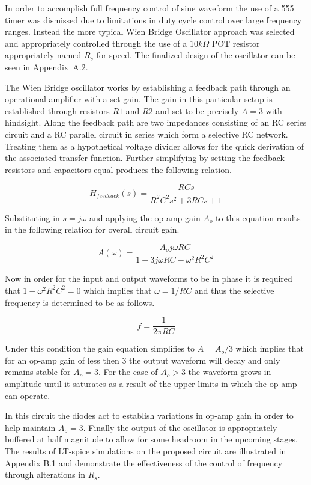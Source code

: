 \documentclass[12pt]{article}
\begin{document}
In order to accomplish full frequency control of sine waveform the use of a 555 timer was dismissed due to limitations in duty cycle control over large frequency ranges. Instead the more typical Wien Bridge Oscillator approach was selected and appropriately controlled through the use of a $10k\Omega$ POT resistor appropriately named $R_s$ for speed. The finalized design of the oscillator can be seen in Appendix~A.2.

The Wien Bridge oscillator works by establishing a feedback path through an operational amplifier with a set gain. The gain in this particular setup is established through resistors $R1$ and $R2$ and set to be precisely $A=3$ with hindsight. Along the feedback path are two impedances consisting of an RC series circuit and a RC parallel circuit in series which form a selective RC network. Treating them as a hypothetical voltage divider allows for the quick derivation of the associated transfer function. Further simplifying by setting the feedback resistors and capacitors equal produces the following relation.

\begin{equation}
    H_{feedback}(s)= \frac{RCs}{R^2C^2s^2+3RCs+1}
\end{equation}

Substituting in $s=j\omega$ and applying the op-amp gain $A_{o}$ to this equation results in the following relation for overall circuit gain.

\begin{equation}
    A(\omega)= \frac{A_oj\omega RC}{1+3j\omega RC-\omega^2R^2C^2}
\end{equation}

Now in order for the input and output waveforms to be in phase it is required that $1-\omega^2R^2C^2=0$ which implies that $\omega=1/RC$ and thus the selective frequency is determined to be as follows.

\begin{equation}
    f=\frac{1}{2\pi RC}
\end{equation}

Under this condition the gain equation simplifies to $A=A_o/3$ which implies that for an op-amp gain of less then 3 the output waveform will decay and only remains stable for $A_o=3$. For the case of $A_o>3$ the waveform grows in amplitude until it saturates as a result of the upper limits in which the op-amp can operate. 

In this circuit the diodes act to establish variations in op-amp gain in order to help maintain $A_o=3$. Finally the output of the oscillator is appropriately buffered at half magnitude to allow for some headroom in the upcoming stages. The results of LT-spice simulations on the proposed circuit are illustrated in Appendix B.1 and demonstrate the effectiveness of the control of frequency through alterations in $R_s$.
\end{document}
